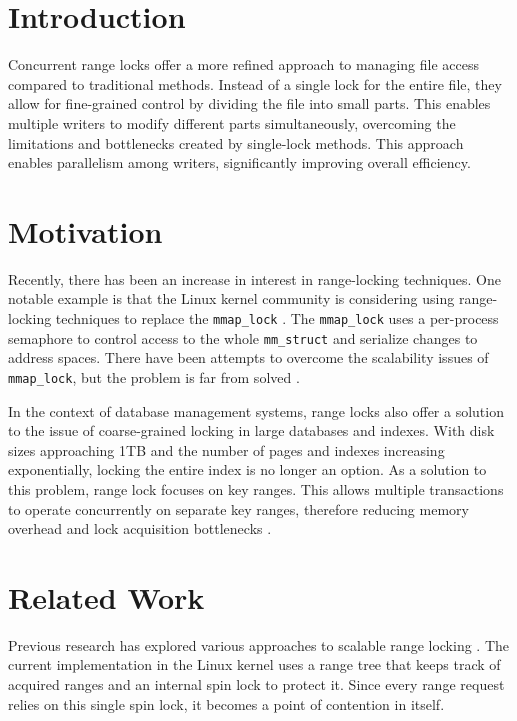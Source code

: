 \section{Introduction}

Concurrent range locks offer a more refined approach to managing file access compared to traditional methods. Instead of a single lock for the entire file, they allow for fine-grained control by dividing the file into small parts. This enables multiple writers to modify different parts simultaneously, overcoming the limitations and bottlenecks created by single-lock methods. This approach enables parallelism among writers, significantly improving overall efficiency.

\section{Motivation}
Recently, there has been an increase in interest in range-locking techniques. One notable example is that the Linux kernel community is considering using range-locking techniques to replace the \texttt{mmap\_lock} \parencite{readerWriterLocks2017, mapleTree2021, mmapLock2022}. The \texttt{mmap\_lock} uses a per-process semaphore to control access to the whole \texttt{mm\_struct} \parencite{mmstruct2023} and serialize changes to address spaces. There have been attempts to overcome the scalability issues of \texttt{mmap\_lock}, but the problem is far from solved \parencite{mmapLock2022}.

In the context of database management systems, range locks also offer a solution to the issue of coarse-grained locking in large databases and indexes. With disk sizes approaching 1TB and the number of pages and indexes increasing exponentially, locking the entire index is no longer an option. As a solution to this problem, range lock focuses on key ranges. This allows multiple transactions to operate concurrently on separate key ranges, therefore reducing memory overhead and lock acquisition bottlenecks \parencite{Graefe2020}.

\section{Related Work}
Previous research has explored various approaches to scalable range locking \parencite{linuxRangeLockImpl2013, migrationWM2023, scalableRangeLock2020}. The current implementation in the Linux kernel uses a range tree \parencite{linuxRangeLockImpl2013} that keeps track of acquired ranges and an internal spin lock to protect it. Since every range request relies on this single spin lock, it becomes a point of contention in itself.

